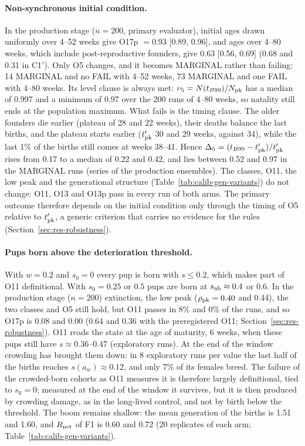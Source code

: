 \paragraph{Non-synchronous initial condition.}
In the production stage ($n=200$, primary evaluator), initial ages drawn uniformly over 4--52 weeks give
O17p $=0.93$ [0.89, 0.96], and ages over 4--80 weeks, which include post-reproductive founders, give 0.63 [0.56,
0.69] (0.68 and 0.31 in \textsf{C1}$'$). Only O5 changes, and it becomes MARGINAL rather than failing: 14 MARGINAL
and no FAIL with 4--52 weeks, 73 MARGINAL and one FAIL with 4--80 weeks. Its level clause is always met:
$\nu_5=N(t_{B99})/N_{\rm pk}$ has a median of 0.997 and a minimum of 0.97 over the 200 runs of 4--80 weeks, so natality
still ends at the population maximum. What fails is the timing clause. The older founders die earlier (plateau of 28
and 22 weeks), their deaths balance the last births, and the plateau starts earlier ($t'_{\rm pk}$ 30 and 29 weeks,
against 34), while the last 1\% of the births still comes at weeks 38--41. Hence
$\Delta_5=(t_{B99}-t'_{\rm pk})/t'_{\rm pk}$ rises from 0.17 to a median of 0.22 and 0.42, and lies between 0.52 and 0.97
in the MARGINAL runs (series of the production ensembles). The classes, O11, the low peak and the generational
structure (Table~\ref{tab:calib-gen-variants}) do not change: O11, O13 and O13p pass in every run of both arms. The
primary outcome therefore depends on the initial condition only through the timing of O5 relative to $t'_{\rm pk}$, a
generic criterion that carries no evidence for the rules (Section~\ref{sec:res-robustness}).

\paragraph{Pups born above the deterioration threshold.}
With $w=0.2$ and $s_0=0$ every pup is born with $s\le0.2$, which makes part of O11 definitional. With $s_0=0.25$ or
$0.5$ pups are born at $s_{\rm nb}\approx0.4$ or $0.6$. In the production stage ($n=200$) extinction,
the low peak ($\rho_{\rm pk}=0.40$ and 0.44), the two classes and O5 still hold, but O11 passes in 8\% and 0\% of the
runs, and so O17p is 0.08 and 0.00 (0.64 and 0.36 with the preregistered O11; Section~\ref{sec:res-robustness}). O11
reads the state at the age of maturity, 6 weeks, when these pups still have $s\approx0.36$--0.47 (exploratory runs).
At the end of the window crowding has brought them down: in 8 exploratory runs per value the last half of the births
reaches $s(a_w)\approx0.12$, and only 7\% of its females breed. The failure of the crowded-born cohorts as O11 measures
it is therefore largely definitional, tied to $s_0=0$; measured at the end of the window it survives, but it is then
produced by crowding damage, as in the long-lived control, and not by birth below the threshold. The boom remains
shallow: the mean generation of the births is 1.51 and 1.60, and $R_{\rm net}$ of F1 is 0.60 and 0.72 (20 replicates
of each arm; Table~\ref{tab:calib-gen-variants}).

